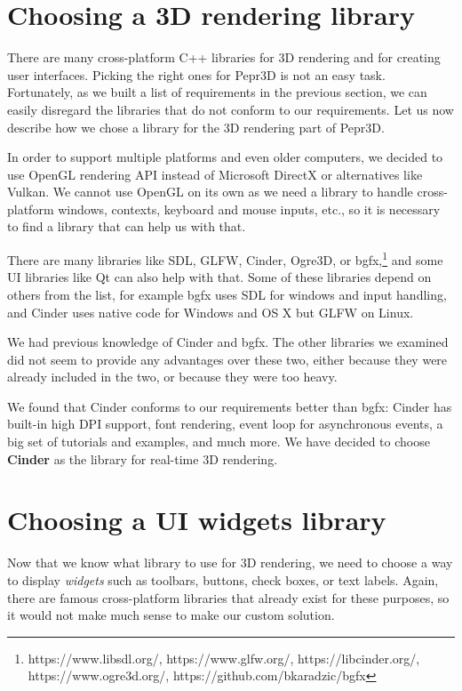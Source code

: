 \section{Choosing a 3D rendering library}

There are many cross-platform C++ libraries for 3D rendering and for creating user interfaces.
Picking the right ones for Pepr3D is not an easy task.
Fortunately, as we built a list of requirements in the previous section, we can easily disregard the libraries that do not conform to our requirements.
Let us now describe how we chose a library for the 3D rendering part of Pepr3D.

\medskip

In order to support multiple platforms and even older computers, we decided to use OpenGL rendering API instead of Microsoft DirectX or alternatives like Vulkan.
We cannot use OpenGL on its own as we need a library to handle cross-platform windows, contexts, keyboard and mouse inputs, etc., so it is necessary to find a library that can help us with that.

There are many libraries like SDL, GLFW, Cinder, Ogre3D, or bgfx,\footnote{https://www.libsdl.org/, https://www.glfw.org/, https://libcinder.org/, https://www.ogre3d.org/, https://github.com/bkaradzic/bgfx} and some UI libraries like Qt can also help with that.
Some of these libraries depend on others from the list, for example bgfx uses SDL for windows and input handling, and Cinder uses native code for Windows and OS X but GLFW on Linux.

We had previous knowledge of Cinder and bgfx.
The other libraries we examined did not seem to provide any advantages over these two, either because they were already included in the two, or because they were too heavy.

We found that Cinder conforms to our requirements better than bgfx:
Cinder has built-in high DPI support, font rendering, event loop for asynchronous events, a big set of tutorials and examples, and much more.
We have decided to choose \textbf{Cinder} as the library for real-time 3D rendering.

\section{Choosing a UI widgets library}

Now that we know what library to use for 3D rendering, we need to choose a way to display \emph{widgets} such as toolbars, buttons, check boxes, or text labels.
Again, there are famous cross-platform libraries that already exist for these purposes, so it would not make much sense to make our custom solution.

